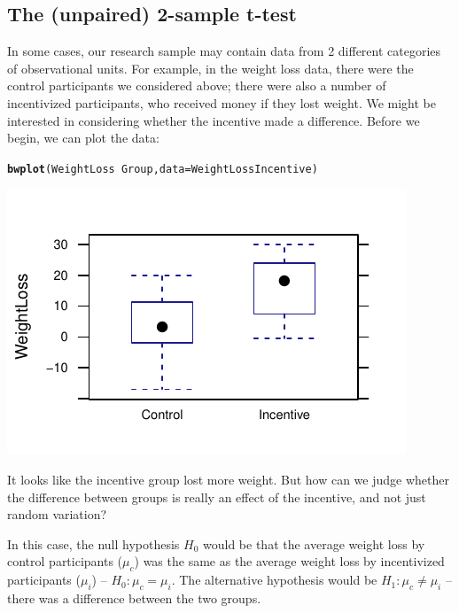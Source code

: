 \documentclass[twoside]{book}\usepackage[]{graphicx}\usepackage[]{xcolor}
\makeatletter
\def\maxwidth{ %
  \ifdim\Gin@nat@width>\linewidth
    \linewidth
  \else
    \Gin@nat@width
  \fi
}
\newcommand{\hlopt}[1]{\textcolor[rgb]{0,0,0}{#1}}%
\newcommand{\hlstd}[1]{\textcolor[rgb]{0.345,0.345,0.345}{#1}}%
\newcommand{\hlkwc}[1]{\textcolor[rgb]{0.333,0.667,0.333}{#1}}%
\newcommand{\hlkwd}[1]{\textcolor[rgb]{0.737,0.353,0.396}{\textbf{#1}}}%
\newenvironment{kframe}{%
 \def\at@end@of@kframe{}%
 \ifinner\ifhmode%
  \def\at@end@of@kframe{\end{minipage}}%
  \begin{minipage}{\columnwidth}%
 \fi\fi%
 \def\FrameCommand##1{\hskip\@totalleftmargin \hskip-\fboxsep
 \colorbox{shadecolor}{##1}\hskip-\fboxsep
     \hskip-\linewidth \hskip-\@totalleftmargin \hskip\columnwidth}%
 \MakeFramed {\advance\hsize-\width
   \@totalleftmargin\z@ \linewidth\hsize
   \@setminipage}}%
 {\par\unskip\endMakeFramed%
 \at@end@of@kframe}
\newenvironment{knitrout}{}{} %
\newcounter{example}[section]
\makeatother
\begin{document}
\subsection{The (unpaired) 2-sample t-test}
In some cases, our research sample may contain data from 2 different categories of observational units.  For example, in the weight loss data, there were the control participants we considered above; there were also a number of incentivized participants, who received money if they lost weight.  We might be interested in considering whether the incentive made a difference.  Before we begin, we can plot the data:
\begin{knitrout}
\color{fgcolor}\begin{kframe}
\begin{alltt}
\hlkwd{bwplot}\hlstd{(WeightLoss} \hlopt{~} \hlstd{Group,} \hlkwc{data} \hlstd{= WeightLossIncentive)}
\end{alltt}
\end{kframe}

{\centering \includegraphics[width=\maxwidth]{figures/fig-unnamed-chunk-251-1} 

}



\end{knitrout}

It looks like the incentive group lost more weight.  But how can we judge whether the difference between groups is really an effect of the incentive, and not just random variation?

In this case, the null hypothesis $H_0$ would be that the average weight loss by control participants ($\mu_c$) was the same as the average weight loss by incentivized participants ($\mu_i$) -- $H_0: \mu_c = \mu_i$.  The alternative hypothesis would be $H_1: \mu_c \neq \mu_i$ -- there was a difference between the two groups.
\end{document}
